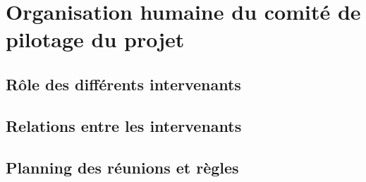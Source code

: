 
\section{Organisation humaine du comité de pilotage du projet}

    \subsection{Rôle des différents intervenants}

    \subsection{Relations entre les intervenants}

    \subsection{Planning des réunions et règles}
\pagebreak
